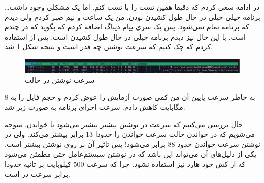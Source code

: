 در ادامه سعی کردم که دقیقا همین تست را با
تست کنم. اما یک مشکلی وجود داشت\dots
برنامه خیلی خیلی در حال طول کشیدن بودن. من یک ساعت و نیم صبر کردم ولی دیدم که برنامه تمام نمی‌شود. پس یک سری
پیام دیباگ اضافه کردم که بگوید که در
چندم است. با این حال نیز دیدم برنامه خیلی در حال طول کشیدن است. پس از
استفاده کردم که چک کنیم که سرعت نوشتن چه قدر است و نتیجه شکل
\ref{fig:direct_io_write_speed}
شد.
\begin{figure}[H]
    \centering
    \includegraphics[scale=0.3]{pic/1-write-direct.png}
    \caption{سرعت نوشتن در حالت }
    \label{fig:direct_io_write_speed}
\end{figure}

به خاطر سرعت پایین آن من کمی صورت آزمایش را عوض کردم و حجم فایل را به 8 مگابایت کاهش دادم. سرعت اجرای برنامه به صورت
زیر شد:




حال بررسی می‌کنیم که سرعت در نوشتن بیشتر بیشتر می‌شود یا خواندن. متوجه می‌شویم که در خواندن حالت
سرعت خواندن را حدودا 13 برابر بیشتر می‌کند. ولی در نوشتن سرعت خواندن حدود 88 برابر می‌شود!
پس تاثیر آن بر روی نوشتن بیشتر است. یکی از دلیل‌های آن می‌تواند این باشد که در نوشتن سیستم‌عامل حتی مطمئن می‌شود که
از کش خود هارد نیز استفاده نشود. چرا که سرعت 500 کیلوبایت بر ثانیه حدودا برابر سرعت
در
است.